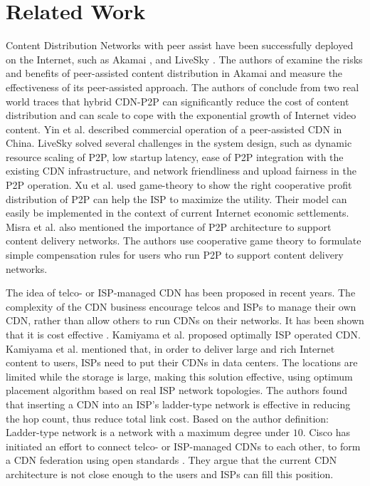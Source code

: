 \documentclass[10pt,final,journal,a4paper]{IEEEtran}
\begin{document}
\section{Related Work}\label{relatedwork}
Content Distribution Networks with peer assist have been successfully deployed on the Internet, such as Akamai \cite{Zhao:2013:PCD:2504730.2504752}, \cite{Huang:2008:UHC:1496046.1496064} and LiveSky \cite{Yin:2010:LEC:1823746.1823750}.  
The authors of \cite{Zhao:2013:PCD:2504730.2504752} examine the risks and benefits of peer-assisted content distribution in Akamai and measure the effectiveness of its peer-assisted approach. 
The authors of \cite{Huang:2008:UHC:1496046.1496064} conclude from two real world traces that hybrid CDN-P2P can significantly reduce the cost of content distribution and can scale to cope with the exponential growth of Internet video content.  
Yin et al. \cite{Yin:2010:LEC:1823746.1823750} described commercial operation of a peer-assisted CDN in China.  
LiveSky solved several challenges in the system design, such as dynamic resource scaling of P2P, low startup latency, ease of P2P integration with the existing CDN infrastructure, and network friendliness and upload fairness in the P2P operation.  
Xu et al.\cite{DBLP:journals/corr/abs-1212-4915} used game-theory to show the right cooperative profit distribution of P2P can help the ISP to maximize the utility.  
Their model can easily be implemented in the context of current Internet economic settlements.  
Misra et al.\cite{Misra:2010:IPS:1811099.1811064} also mentioned the importance of P2P architecture to support content delivery networks.
The authors use cooperative game theory to formulate simple compensation rules for users who run P2P to support content delivery networks.

The idea of telco- or ISP-managed CDN has been proposed in recent years.  
The complexity of the CDN business encourage telcos and ISPs to manage their own CDN, rather than allow others to run CDNs on their networks.  
It has been shown that it is cost effective \cite{federation}\cite{norton2011internet}. 
Kamiyama et al. \cite{NoriakiKAMIYAMA2013} proposed optimally ISP operated CDN.
Kamiyama et al. mentioned that, in order to deliver large and rich Internet content to users, ISPs need to put their CDNs in data centers.  
The locations are limited while the storage is large, making this solution effective, using optimum placement algorithm based on real ISP network topologies.  
The authors found that inserting a CDN into an ISP's ladder-type network is effective in reducing the hop count, thus reduce total link cost.  
Based on the author definition: Ladder-type network is a network with a maximum degree under $10$.
Cisco has initiated an effort to connect telco- or ISP-managed CDNs to each other, to form a CDN federation \cite{federation} using open standards \cite{cdni}.  
They argue that the current CDN architecture is not close enough to the users and ISPs can fill this position.
\end{document}
